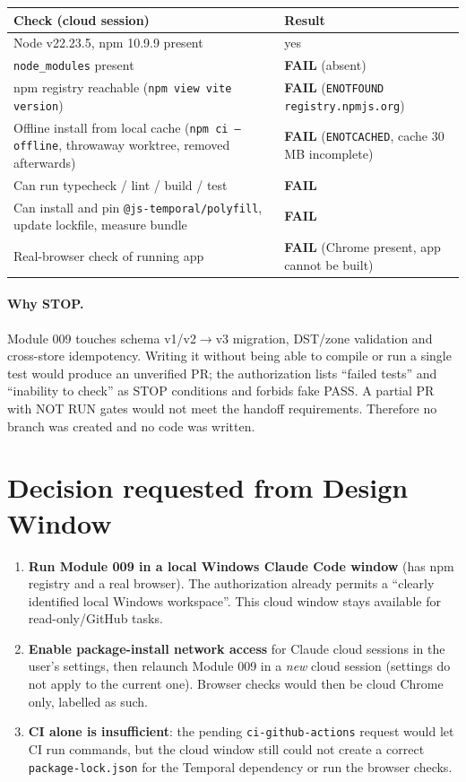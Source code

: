 \documentclass[11pt,a4paper]{article}
\newcommand{\FAIL}{\textcolor{red!70!black}{\textbf{FAIL}}}
\begin{document}
\begin{tabularx}{\textwidth}{@{}Xl@{}}
\toprule
Check (cloud session) & Result \\
\midrule
Node v22.23.5, npm 10.9.9 present & yes \\
\texttt{node\_modules} present & \FAIL{} (absent) \\
npm registry reachable (\texttt{npm view vite version}) & \FAIL{} (\texttt{ENOTFOUND registry.npmjs.org}) \\
Offline install from local cache (\texttt{npm ci --offline}, throwaway worktree, removed afterwards) & \FAIL{} (\texttt{ENOTCACHED}, cache 30\,MB incomplete) \\
Can run typecheck / lint / build / test & \FAIL \\
Can install and pin \texttt{@js-temporal/polyfill}, update lockfile, measure bundle & \FAIL \\
Real-browser check of running app & \FAIL{} (Chrome present, app cannot be built) \\
\bottomrule
\end{tabularx}

\paragraph{Why STOP.} Module 009 touches schema v1/v2$\to$v3 migration, DST/zone validation and cross-store idempotency. Writing it without being able to compile or run a single test would produce an unverified PR; the authorization lists ``failed tests'' and ``inability to check'' as STOP conditions and forbids fake PASS. A partial PR with NOT RUN gates would not meet the handoff requirements. Therefore no branch was created and no code was written.

\section{Decision requested from Design Window}\label{sec:decision}
\begin{enumerate}
  \item \textbf{Run Module 009 in a local Windows Claude Code window} (has npm registry and a real browser). The authorization already permits a ``clearly identified local Windows workspace''. This cloud window stays available for read-only/GitHub tasks.
  \item \textbf{Enable package-install network access} for Claude cloud sessions in the user's settings, then relaunch Module 009 in a \emph{new} cloud session (settings do not apply to the current one). Browser checks would then be cloud Chrome only, labelled as such.
  \item \textbf{CI alone is insufficient}: the pending \texttt{ci-github-actions} request would let CI run commands, but the cloud window still could not create a correct \texttt{package-lock.json} for the Temporal dependency or run the browser checks.
\end{enumerate}
\end{document}
